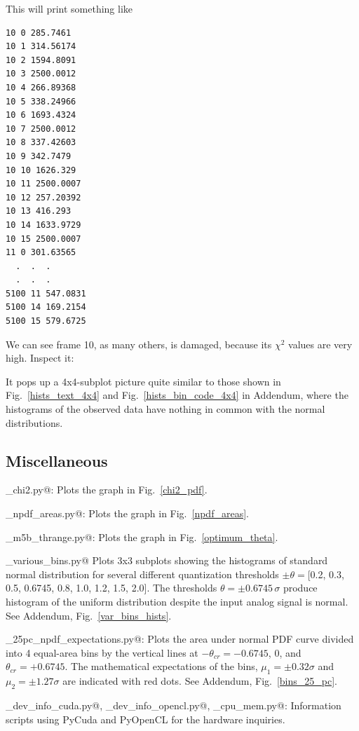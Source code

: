 \documentclass[letterpaper,twoside,12pt]{article}
\begin{document}
This will print something like
\begin{verbatim}
10 0 285.7461
10 1 314.56174
10 2 1594.8091
10 3 2500.0012
10 4 266.89368
10 5 338.24966
10 6 1693.4324
10 7 2500.0012
10 8 337.42603
10 9 342.7479
10 10 1626.329
10 11 2500.0007
10 12 257.20392
10 13 416.293
10 14 1633.9729
10 15 2500.0007
11 0 301.63565
  .  .  .  
  .  .  .  
5100 11 547.0831
5100 14 169.2154
5100 15 579.6725
\end{verbatim}

We can see frame 10, as many others, is damaged, because its $\chi^2$ values are very high. Inspect it: \\

\noindent \verb@%run inspect_nt.py rd1910_wz_268-1811_text.m5b 056  10 1@ \\

It pops up a 4x4-subplot picture quite similar to those shown in Fig.~\ref{hists_text_4x4} and Fig.~\ref{hists_bin_code_4x4} in Addendum, where the histograms of the observed data have nothing in common with the normal distributions. 



\subsection{Miscellaneous}

\noindent \verb@plot_chi2.py@: Plots the graph in Fig.~\ref{chi2_pdf}. \par
\noindent \verb@plot_npdf_areas.py@: Plots the graph in Fig.~\ref{npdf_areas}. \par
\noindent \verb@plot_m5b_thrange.py@: Plots the graph in Fig.~\ref{optimum_theta}. \par
\hangindent=1cm 
\noindent \verb@plot_various_bins.py@ Plots 3x3 subplots showing the histograms of standard normal distribution for several different quantization thresholds $\pm\theta = $[0.2, 0.3, 0.5, 0.6745, 0.8, 1.0, 1.2, 1.5, 2.0]. The thresholds $\theta = \pm 0.6745 \, \sigma$ produce histogram of the uniform distribution despite the input analog signal is normal. See Addendum, Fig.~\ref{var_bins_hists}. \par
\hangindent=1cm 
\noindent \verb@plot_25pc_npdf_expectations.py@: Plots the area under normal PDF curve divided into 4 
equal-area bins by the vertical lines at $-\theta_{cr} = -0.6745$, 0, and $\theta_{cr} = +0.6745$. The mathematical expectations of the bins, $\mu_1=\pm 0.32\sigma$ and $\mu_2=\pm 1.27\sigma$ are indicated with red dots. See Addendum, Fig.~\ref{bins_25_pc}.  \par
\hangindent=1cm 
\noindent \verb@get_dev_info_cuda.py@, \verb@get_dev_info_opencl.py@, \verb@get_cpu_mem.py@: Information scripts using PyCuda and PyOpenCL for the hardware inquiries. 
\end{document}
